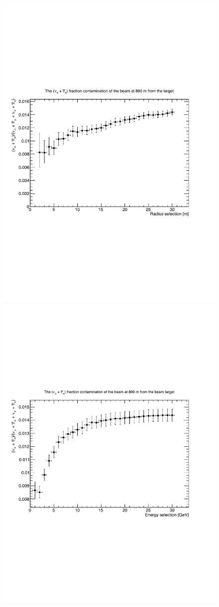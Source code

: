 \begin{figure}[htbp]
\begin{center}
 	\includegraphics[width=120mm]{Chapter3/figures/400GeV_PF_nueAndNueBarRatio_RadiusCuts.pdf}
 	\includegraphics[width=120mm]{Chapter3/figures/400GeV_PF_nueAndNueBarRatio_EnergyCuts.pdf}

\end{center}
\end{figure}
